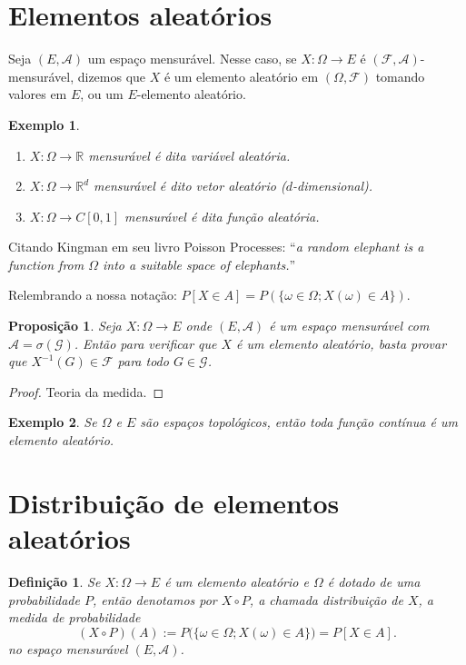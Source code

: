 \documentclass[reqno]{article}
\newcommand*\1{\mathds{1}}
\newtheorem{proposition}[theorem]{Proposição}
\newtheorem{definition}[theorem]{Definição}
\newtheorem{example}{Exemplo}[section]
\begin{document}
\section{Elementos aleatórios}

Seja $(E,\mathcal{A})$ um espaço mensurável.
Nesse caso, se $X: \Omega \to E$ é $(\mathcal{F}, \mathcal{A})$-mensurável, dizemos que $X$ é um elemento aleatório em $(\Omega, \mathcal{F})$ tomando valores em $E$, ou um $E$-elemento aleatório.

\begin{example} \mbox{}
  \begin{enumerate}
  \item $X:\Omega \to \mathbb{R}$ mensurável é dita variável aleatória.
  \item $X:\Omega \to \mathbb{R}^d$ mensurável é dito vetor aleatório ($d$-dimensional).
  \item $X:\Omega \to C[0,1]$ mensurável é dita função aleatória.
  \end{enumerate}
\end{example}

Citando Kingman em seu livro Poisson Processes: ``\emph{a random elephant is a function from $\Omega$ into a suitable space of elephants.}''

Relembrando a nossa notação: $P[X \in A] = P(\{\omega \in \Omega; X(\omega) \in A\})$.

\newpage

\begin{proposition}
  Seja $X:\Omega \to E$ onde $(E, \mathcal{A})$ é um espaço mensurável com $\mathcal{A} = \sigma(\mathcal{G})$.
  Então para verificar que $X$ é um elemento aleatório, basta provar que $X^{-1}(G) \in \mathcal{F}$ para todo $G \in \mathcal{G}$.
\end{proposition}

\begin{proof}
  Teoria da medida.
\end{proof}

\begin{example}
  Se $\Omega$ e $E$ são espaços topológicos, então toda função contínua é um elemento aleatório.
\end{example}

\section{Distribuição de elementos aleatórios}


\begin{definition}
  Se $X:\Omega \to E$ é um elemento aleatório e $\Omega$ é dotado de uma probabilidade $P$, então denotamos por $X \circ P$, a chamada \emph{distribuição de $X$}, a medida de probabilidade
  \begin{equation}
    (X \circ P)(A) := P\big( \{\omega \in \Omega; X(\omega) \in A\} \big) = P[X \in A].
  \end{equation}
  no espaço mensurável $(E,\mathcal{A})$.
\end{definition}
\end{document}
